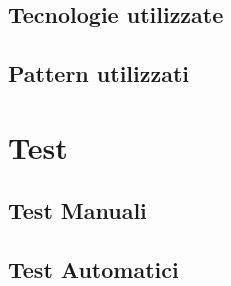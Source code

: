 \documentclass[a4paper]{report}
\begin{document}
    \section{Tecnologie utilizzate}
        
    \section{Pattern utilizzati}


\chapter{Test}
    \section{Test Manuali}
    \section{Test Automatici}



    
\end{document}
